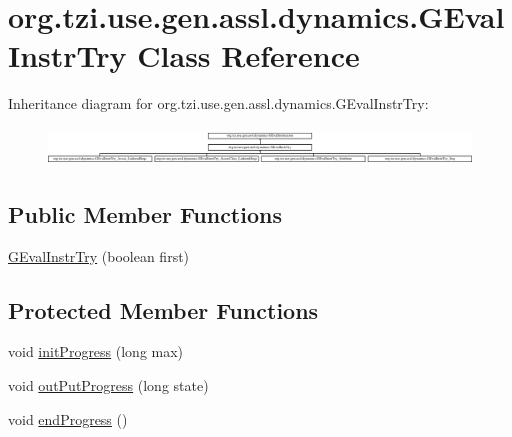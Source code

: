 \hypertarget{classorg_1_1tzi_1_1use_1_1gen_1_1assl_1_1dynamics_1_1_g_eval_instr_try}{\section{org.\-tzi.\-use.\-gen.\-assl.\-dynamics.\-G\-Eval\-Instr\-Try Class Reference}
\label{classorg_1_1tzi_1_1use_1_1gen_1_1assl_1_1dynamics_1_1_g_eval_instr_try}
}
Inheritance diagram for org.\-tzi.\-use.\-gen.\-assl.\-dynamics.\-G\-Eval\-Instr\-Try\-:\begin{figure}[H]
\begin{center}
\leavevmode
\includegraphics[height=1.002387cm]{classorg_1_1tzi_1_1use_1_1gen_1_1assl_1_1dynamics_1_1_g_eval_instr_try}
\end{center}
\end{figure}
\subsection*{Public Member Functions}
\begin{DoxyCompactItemize}
\item 
\hyperlink{classorg_1_1tzi_1_1use_1_1gen_1_1assl_1_1dynamics_1_1_g_eval_instr_try_a66ddbeb053ecf330b0778dc425eb394f}{G\-Eval\-Instr\-Try} (boolean first)
\end{DoxyCompactItemize}
\subsection*{Protected Member Functions}
\begin{DoxyCompactItemize}
\item 
void \hyperlink{classorg_1_1tzi_1_1use_1_1gen_1_1assl_1_1dynamics_1_1_g_eval_instr_try_aa46654644fe739f51b5b6d03ad0307a5}{init\-Progress} (long max)
\item 
void \hyperlink{classorg_1_1tzi_1_1use_1_1gen_1_1assl_1_1dynamics_1_1_g_eval_instr_try_a774ade4b5d0b68b77bfe2d3b700510c9}{out\-Put\-Progress} (long state)
\item 
void \hyperlink{classorg_1_1tzi_1_1use_1_1gen_1_1assl_1_1dynamics_1_1_g_eval_instr_try_a67869480d1c05183386a28d0567778fc}{end\-Progress} ()
\end{DoxyCompactItemize}


